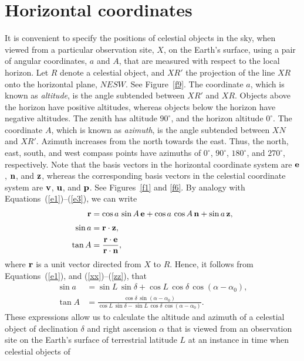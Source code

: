 \section{Horizontal coordinates}
It is convenient to specify the positions of celestial objects  in the sky, when viewed from
a particular observation site, $X$, on the Earth's surface, using a pair of angular coordinates, $a$ and $A$,
that are measured with respect to the local horizon. Let $R$ denote
a celestial object, and $XR'$ the projection of the line $XR$ onto the
horizontal plane, $NESW$. See Figure~\ref{f9}. The coordinate $a$, which
is known as {\em altitude}, is the angle subtended between $XR'$ and
$XR$. Objects above the horizon have positive altitudes, whereas
objects below the horizon have negative altitudes. The
zenith has altitude $90^\circ$, and the horizon altitude $0^\circ$. The coordinate $A$,
which is known as {\em azimuth}, is the angle subtended between 
$XN$ and $XR'$. Azimuth increases from the north towards the east. Thus, the
north, east, south, and west compass points have azimuths of
$0^\circ$, $90^\circ$, $180^\circ$, and $270^\circ$, respectively. 
Note that the basis vectors in the horizontal coordinate system are ${\bf e}$,
${\bf n}$, and ${\bf z}$, whereas the corresponding basis vectors in the
celestial coordinate system are ${\bf v}$, ${\bf u}$, and ${\bf p}$. See Figures~\ref{f1} and \ref{f6}. By analogy with Equations~(\ref{e1})--(\ref{e3}), we can write
\begin{align}\label{e27}
{\bf r} &= \cos a\,\sin A\,{\bf e} + \cos a\,\cos A\,{\bf n}  + \sin a\,{\bf z},\\[0.5ex]
\sin a &= {\bf r}\cdot {\bf z},\\[0.5ex]
\tan A &= \frac{{\bf r}\cdot {\bf e}}{{\bf r}\cdot {\bf n}},
\end{align}
where ${\bf r}$ is a unit vector directed from $X$ to $R$.
Hence, it follows from Equations~(\ref{e1}), and (\ref{xx})--(\ref{zz}), that
\begin{align}\label{e30}
\sin a &= \sin L\,\sin \delta + \cos L\,\cos \delta\,\cos(\alpha-\alpha_0),\\[0.5ex]
\tan A &= \frac{\cos \delta\,\sin (\alpha-\alpha_0)}{\cos L\,\sin \delta - \sin L\,\cos\delta\,\cos(\alpha - \alpha_0)}.\label{e31}
\end{align}
These expressions allow us to calculate the altitude and azimuth of a
celestial object of declination $\delta$ and right ascension $\alpha$
that is viewed from an observation  site on the Earth's surface of terrestrial latitude $L$ at an instance in time when celestial objects of
